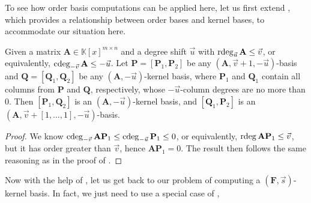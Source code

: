 To see how order basis computations can be applied here, let us first
extend , which provides
a relationship between order bases and kernel bases, to accommodate
our situation here.
\begin{lem}
\label{lem:orderbasisContainsNullspacebasisGeneralized}Given a matrix
$\mathbf{A}\in\mathbb{K}\left[x\right]^{m\times n}$ and a degree
shift $\vec{u}$ with $\rdeg_{\vec{u}}\mathbf{A}\le\vec{v}$, or equivalently,
$\cdeg_{-\vec{v}}\mathbf{A}\le-\vec{u}$. Let $\mathbf{P}=\left[\mathbf{P}_{1},\mathbf{P}_{2}\right]$
be any $\left(\mathbf{A},\vec{v}+1,-\vec{u}\right)$-basis and $\mathbf{Q}=\left[\mathbf{Q}_{1},\mathbf{Q}_{2}\right]$
be any $(\mathbf{A},-\vec{u})$-kernel basis, where $\mathbf{P}_{1}$
and $\mathbf{Q}_{1}$ contain all columns from $\mathbf{P}$ and $\mathbf{Q}$,
respectively, whose $-\vec{u}$-column degrees are no more than $0$.
Then $\left[\mathbf{P}_{1},\mathbf{Q}_{2}\right]$ is an $(\mathbf{A},-\vec{u})$-kernel
basis, and $\left[\mathbf{Q}_{1},\mathbf{P}_{2}\right]$ is an $\left(\mathbf{A},\vec{v}+\left[1,\dots,1\right],-\vec{u}\right)$-basis.\end{lem}
\begin{proof}
We know $\cdeg_{-\vec{v}}\mathbf{A}\mathbf{P}_{1}\le\cdeg_{-\vec{u}}\mathbf{P}_{1}\le0$,
or equivalently, $\rdeg\mathbf{A}\mathbf{P}_{1}\le\vec{v}$, but it
has order greater than $\vec{v}$, hence $\mathbf{A}\mathbf{P}_{1}=0$.
The result then follows the same reasoning as in the proof of .%
\begin{comment}
We know $\cdeg\mathbf{P}_{1}^{T}\le\vec{u}$ from $\cdeg_{-\vec{u}}\mathbf{P}_{1}\le0$,
hence $\cdeg\mathbf{P}_{1}^{T}\mathbf{A}^{T}\le\cdeg_{\vec{u}}\mathbf{A}^{T}$
by \prettyref{lem:boundOnDegreesOfFA}. Now for each row $\mathbf{a}_{i}$
in $\mathbf{A}$ and its $\vec{u}$-column degree $v_{i}$, we have
\[
\rdeg\mathbf{a}_{i}\mathbf{P}_{1}=\cdeg\mathbf{P}_{1}^{T}\mathbf{a}_{i}^{T}\le\cdeg_{\vec{u}}\mathbf{a}_{i}^{T}=v_{i},
\]
 and $\mathbf{a}_{i}\mathbf{P}_{1}\equiv0\mod x^{v_{i}+1}$, hence
$\mathbf{A}\mathbf{P}_{1}=0$. The result then follows the same reasoning
as in the proof of \prettyref{lem:orderBasisContainsNullspaceBasis}.
\end{comment}

\end{proof}
Now with the help of ,
let us get back to our problem of computing a $(\mathbf{F},\vec{s})$-kernel
basis.  In fact, we just need to use a special case of ,
